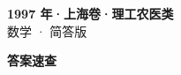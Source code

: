 \documentclass[zihao=-4, a4paper]{ctexart}
\begin{document}
\begin{center}
  {\Large\bfseries 1997 年·上海卷·理工农医类}\\[4pt]
  {\large 数学 · 简答版}
\end{center}
\medskip
{}

\clearpage
{}
\begin{center}{\Large\bfseries 答案速查}\end{center}
\medskip

\end{document}
